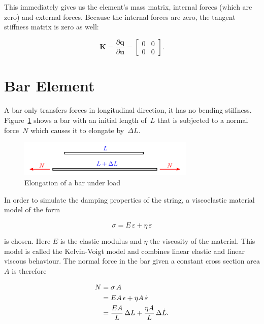 This immediately gives us the element's mass matrix, internal forces (which are zero) and external forces.
Because the internal forces are zero, the tangent stiffness matrix is zero as well:

\begin{equation}
\boldsymbol{K} = \frac{\partial \boldsymbol{q}}{\partial \boldsymbol{u}} =
\begin{bmatrix}
0 & 0\\
0 & 0
\end{bmatrix}.
\end{equation}

\newpage
\section{Bar Element}

A bar only transfers forces in longitudinal direction, it has no bending stiffness. Figure~\ref{fig:bar-element-1} shows a bar with an initial length of~$L$ that is subjected to a normal force~$N$ which causes it to elongate by~$\Delta L$.

\begin{figure}[h]
\centering
\includegraphics[width=0.75\textwidth]{figures/elements/bar-element-1}
\caption{Elongation of a bar under load}
\label{fig:bar-element-1}
\end{figure}

In order to simulate the damping properties of the string, a viscoelastic material model of the form

\begin{equation}
\sigma = E\,\varepsilon + \eta\,\dot{\varepsilon}
\end{equation}

is chosen. Here $E$ is the elastic modulus and $\eta$ the viscosity of the material. This model is called the Kelvin-Voigt model and combines linear elastic and linear viscous behaviour. The normal force in the bar given a constant cross section area $A$ is therefore

\begin{align}
N &= \sigma\,A \notag \\
&= EA\,\epsilon + \eta A\,\dot{\varepsilon} \notag \\
&= \frac{EA}{L}\,\Delta L + \frac{\eta A}{L}\,\Delta \dot{L}.\label{eq:bar-constitutive}
\end{align}

